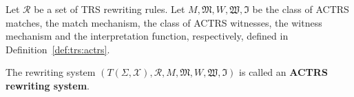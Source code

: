 \documentclass{book}
\begin{document}
\begin{definition}
  Let $\mathcal{R}$ be a set of TRS rewriting rules. 
  Let $M, \mathfrak{M}, W, \mathfrak{W}, \mathfrak{I}$ be the class of ACTRS matches, the match mechanism, the class of ACTRS witnesses, the witness mechanism and the interpretation function, respectively, defined in Definition~\ref{def:trs:actrs}.

  The rewriting system $(T(\Sigma,\mathcal{X}), \mathcal{R}, M, \mathfrak{M}, W, \mathfrak{W}, \mathfrak{I})$ is called an \textbf{ACTRS rewriting system}.
\end{definition}



% 

\end{document}
